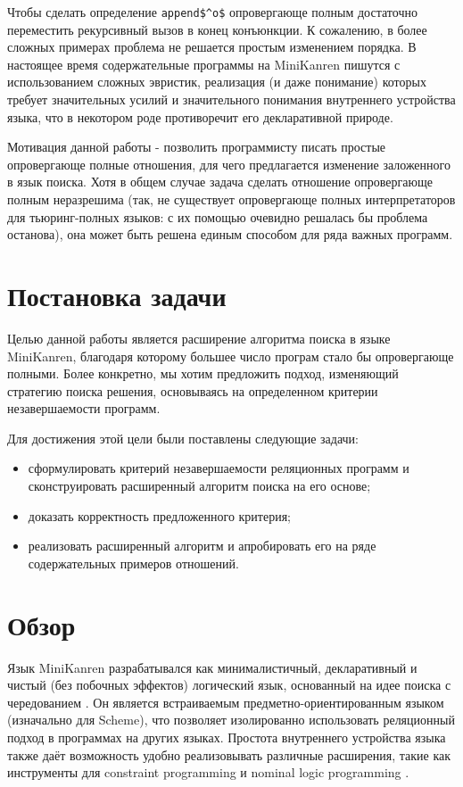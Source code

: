     Чтобы сделать определение \lstinline|append$^o$| опровергающе полным достаточно переместить рекурсивный вызов в конец конъюнкции. К сожалению, в более сложных примерах проблема не решается простым изменением порядка. В настоящее время содержательные программы на MiniKanren пишутся с использованием сложных эвристик, реализация (и даже понимание) которых требует значительных усилий и значительного понимания внутреннего устройства языка, что в некотором роде противоречит его декларативной природе.

    Мотивация данной работы - позволить программисту писать простые опровергающе полные отношения, для чего предлагается изменение заложенного в язык поиска. Хотя в общем случае задача сделать отношение опровергающе полным неразрешима (так, не существует опровергающе полных интерпретаторов для тьюринг-полных языков: с их помощью очевидно решалась бы проблема останова), она может быть решена единым способом для ряда важных программ.

  \section{Постановка задачи}
  
    Целью данной работы является расширение алгоритма поиска в языке MiniKanren, благодаря которому большее число програм стало бы опровергающе полными. Более конкретно, мы хотим предложить подход, изменяющий стратегию поиска решения, основываясь на определенном критерии незавершаемости программ.

    Для достижения этой цели были поставлены следующие задачи:
  
    \begin{itemize}
      \item сформулировать критерий незавершаемости реляционных программ и сконструировать расширенный алгоритм поиска на его основе;
      \item доказать корректность предложенного критерия;
      \item реализовать расширенный алгоритм и апробировать его на ряде содержательных примеров отношений.
    \end{itemize}
  
  \section{Обзор}
  
    Язык MiniKanren разрабатывался как минималистичный, декларативный и чистый (без побочных эффектов) логический язык, основанный на идее поиска с чередованием \cite{Interleaving}. Он является встраиваемым предметно-ориентированным языком (изначально для Scheme), что позволяет изолированно использовать реляционный подход в программах на других языках. Простота внутреннего устройства языка также даёт возможность удобно реализовывать различные расширения, такие как инструменты для constraint programming \cite{CKanren} и nominal logic programming \cite{alphaKanren}.

